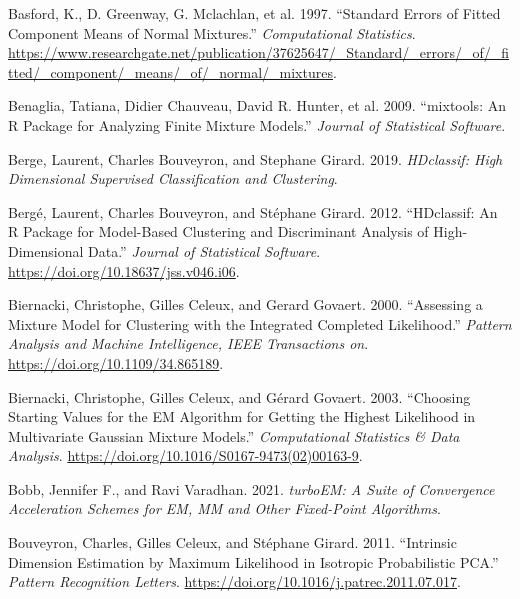 \begin{CSLReferences}{1}{0}
\leavevmode{}%
Basford, K., D. Greenway, G. Mclachlan, et al. 1997. {``Standard Errors of Fitted Component Means of Normal Mixtures.''} \emph{Computational Statistics}. \url{https://www.researchgate.net/publication/37625647/_Standard/_errors/_of/_fitted/_component/_means/_of/_normal/_mixtures}.

\leavevmode{}%
Benaglia, Tatiana, Didier Chauveau, David R. Hunter, et al. 2009. {``{mixtools}: An {R} Package for Analyzing Finite Mixture Models.''} \emph{Journal of Statistical Software}.

\leavevmode{}%
Berge, Laurent, Charles Bouveyron, and Stephane Girard. 2019. \emph{HDclassif: High Dimensional Supervised Classification and Clustering}.

\leavevmode{}%
Bergé, Laurent, Charles Bouveyron, and Stéphane Girard. 2012. {``{HDclassif}: {An} {R} {Package} for {Model}-{Based} {Clustering} and {Discriminant} {Analysis} of {High}-{Dimensional} {Data}.''} \emph{Journal of Statistical Software}. \url{https://doi.org/10.18637/jss.v046.i06}.

\leavevmode{}%
Biernacki, Christophe, Gilles Celeux, and Gerard Govaert. 2000. {``Assessing a {Mixture Model} for {Clustering} with the {Integrated Completed Likelihood}.''} \emph{Pattern Analysis and Machine Intelligence, IEEE Transactions on}. \url{https://doi.org/10.1109/34.865189}.

\leavevmode{}%
Biernacki, Christophe, Gilles Celeux, and Gérard Govaert. 2003. {``Choosing Starting Values for the {EM} Algorithm for Getting the Highest Likelihood in Multivariate {Gaussian} Mixture Models.''} \emph{Computational Statistics \& Data Analysis}. \url{https://doi.org/10.1016/S0167-9473(02)00163-9}.

\leavevmode{}%
Bobb, Jennifer F., and Ravi Varadhan. 2021. \emph{turboEM: A Suite of Convergence Acceleration Schemes for EM, MM and Other Fixed-Point Algorithms}.

\leavevmode{}%
Bouveyron, Charles, Gilles Celeux, and Stéphane Girard. 2011. {``Intrinsic {Dimension Estimation} by {Maximum Likelihood} in {Isotropic Probabilistic PCA}.''} \emph{Pattern Recognition Letters}. \url{https://doi.org/10.1016/j.patrec.2011.07.017}.


\end{CSLReferences}
